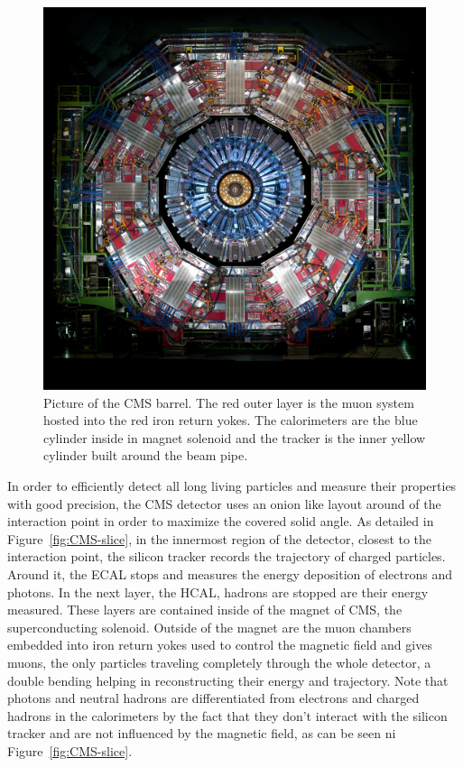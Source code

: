 	\begin{figure}
		\centering
		\includegraphics[width=\linewidth]{fig/chapt2/CMS.jpg}
		\caption{\label{fig:CMS} Picture of the CMS barrel. The red outer layer is the muon system hosted into the red iron return yokes. The calorimeters are the blue cylinder inside in magnet solenoid and the tracker is the inner yellow cylinder built around the beam pipe.}
	\end{figure}
	
	In order to efficiently detect all long living particles and measure their properties with good precision, the CMS detector uses an onion like layout around of the interaction point in order to maximize the covered solid angle. As detailed in Figure~\ref{fig:CMS-slice}, in the innermost region of the detector, closest to the interaction point, the silicon tracker records the trajectory of charged particles. Around it, the \acf{ECAL} stops and measures the energy deposition of electrons and photons. In the next layer, the \acf{HCAL}, hadrons are stopped are their energy measured. These layers are contained inside of the magnet of CMS, the superconducting solenoid. Outside of the magnet are the muon chambers embedded into iron return yokes used to control the magnetic field and gives muons, the only particles traveling completely through the whole detector, a double bending helping in reconstructing their energy and trajectory. Note that photons and neutral hadrons are differentiated from electrons and charged hadrons in the calorimeters by the fact that they don't interact with the silicon tracker and are not influenced by the magnetic field, as can be seen ni Figure~\ref{fig:CMS-slice}.
	
